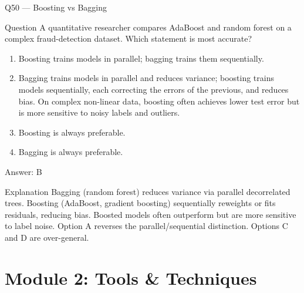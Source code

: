 \documentclass[aspectratio=169,8pt]{beamer}
\begin{document}
	\begin{frame}{Q50 --- Boosting vs Bagging}
		\begin{block}{Question}
			A quantitative researcher compares AdaBoost and random forest on a complex fraud-detection dataset. Which statement is most accurate?
		\end{block}
		\begin{enumerate}
			\item Boosting trains models in parallel; bagging trains them sequentially.
			\item Bagging trains models in parallel and reduces variance; boosting trains models sequentially, each correcting the errors of the previous, and reduces bias. On complex non-linear data, boosting often achieves lower test error but is more sensitive to noisy labels and outliers.
			\item Boosting is always preferable.
			\item Bagging is always preferable.
		\end{enumerate}
		\begin{exampleblock}{Answer: B}\end{exampleblock}
		\begin{block}{Explanation}
			Bagging (random forest) reduces variance via parallel decorrelated trees. Boosting (AdaBoost, gradient boosting) sequentially reweights or fits residuals, reducing bias. Boosted models often outperform but are more sensitive to label noise. Option A reverses the parallel/sequential distinction. Options C and D are over-general.
		\end{block}
	\end{frame}
	
	\section{Module 2: Tools \& Techniques}
	
\end{document}
